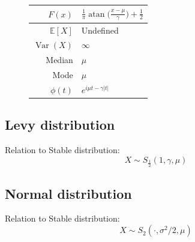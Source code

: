 \documentclass[a4paper,11pt]{article}
\theoremstyle{plain}
\theoremstyle{definition}
\newcommand{\ME}{\mathbb{E}}
\newcommand{\Var}{\operatorname{Var}}
\begin{document}
\begin{figure}[!htb]
\begin{minipage}{0.4\textwidth}
\begin{tabular}{| r | l |}
			\hline
			$F(x)$ & $ \frac{1}{\pi} \operatorname{atan}\Big( \frac{x-\mu}{\gamma} \Big) + \frac{1}{2} $ \\
			\hline
			$\ME[X]$ & Undefined \\
			\hline
			$\Var(X)$ & $\infty $\\
			\hline
			Median & $\mu$ \\
			\hline
			Mode & $\mu$ \\
			\hline
			$\phi(t)$ & $ e^{i\mu t - \gamma |t|}  $ \\
			\hline
		\end{tabular}
	    \end{minipage}
	\end{figure}
	
	
\subsection{Levy distribution}
	Relation to Stable distribution:
	\[X \sim S_{\frac{1}{2}}(1, \gamma, \mu) \]

\subsection{Normal distribution}
Relation to Stable distribution:
\[X \sim S_{2}(\cdot, \sigma^2/2, \mu) \]
\end{document}
